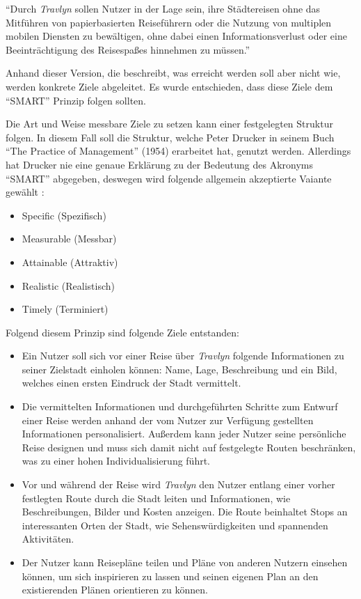 \enquote{Durch \textit{Travlyn} sollen Nutzer in der Lage sein, ihre Städtereisen ohne das Mitführen von papierbasierten Reiseführern oder die Nutzung von multiplen mobilen Diensten zu bewältigen, ohne dabei einen Informationsverlust oder eine Beeinträchtigung des Reisespaßes hinnehmen zu müssen.}

\vspace{0.25cm}

Anhand dieser Version, die beschreibt, was erreicht werden soll aber nicht wie, werden konkrete Ziele abgeleitet. Es wurde entschieden, dass diese Ziele dem \enquote{SMART} Prinzip folgen sollten.

\begin{defStrich}
	Die Art und Weise messbare Ziele zu setzen kann einer festgelegten Struktur folgen. In diesem Fall soll die Struktur, welche Peter Drucker in seinem Buch \enquote{The Practice of Management} (1954) erarbeitet hat, genutzt werden. Allerdings hat Drucker nie eine genaue Erklärung zu der Bedeutung des Akronyms \enquote{SMART} abgegeben, deswegen wird folgende allgemein akzeptierte Vaiante gewählt \cite{Lawlor.2012}:
	\begin{itemize}
		\item Specific (Spezifisch)
		\item Measurable (Messbar)
		\item Attainable (Attraktiv)
		\item Realistic (Realistisch)
		\item Timely (Terminiert)
	\end{itemize}   
\end{defStrich} 

Folgend diesem Prinzip sind folgende Ziele entstanden:

\begin{itemize}
	\item Ein Nutzer soll sich vor einer Reise über \textit{Travlyn} folgende Informationen zu seiner Zielstadt einholen können: Name, Lage, Beschreibung und ein Bild, welches einen ersten Eindruck der Stadt vermittelt.
	\item Die vermittelten Informationen und durchgeführten Schritte zum Entwurf einer Reise werden anhand der vom Nutzer zur Verfügung gestellten Informationen personalisiert. Außerdem kann jeder Nutzer seine persönliche Reise designen und muss sich damit nicht auf festgelegte Routen beschränken, was zu einer hohen Individualisierung führt. 
	\item Vor und während der Reise wird \textit{Travlyn} den Nutzer entlang einer vorher festlegten Route durch die Stadt leiten und Informationen, wie Beschreibungen, Bilder und Kosten anzeigen. Die Route beinhaltet Stops an interessanten Orten der Stadt, wie Sehenswürdigkeiten und spannenden Aktivitäten.
	\item Der Nutzer kann Reisepläne teilen und Pläne von anderen Nutzern einsehen können, um sich inspirieren zu lassen und seinen eigenen Plan an den existierenden Plänen orientieren zu können. 
\end{itemize}

